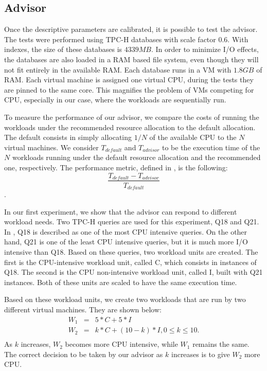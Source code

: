  \subsection{Advisor}
 
 Once the descriptive parameters are calibrated, it is possible to test the advisor. The tests were performed using TPC-H databases with scale factor 0.6. With indexes, the size of these databases is $4339 MB$. In order to minimize I/O effects, the databases are also loaded  in a RAM based file system, even though they will not fit entirely in the available RAM. Each database runs in a VM with $1.8 GB$ of RAM.  Each virtual machine is assigned one virtual CPU, during the tests they are pinned to the same core. This magnifies the problem of VMs competing for CPU, especially in our case, where the workloads are sequentially run.
 
 To measure the performance of our advisor, we compare the costs of running the workloads under the recommended resource allocation to the default allocation. The default consists in simply allocating $1/N$ of the available CPU to the $N$ virtual machines. We consider $T_{default}$ and $T_{advisor}$ to be the execution time of the $N$ workloads running under the default resource allocation and the recommended one, respectively. The performance metric, defined in \cite{Soror:2008:AVM:1376616.1376711}, is the following:
 \[
  \frac{T_{default}-T_{advisor}}{T_{default}}
 \]
.

In our first experiment, we show that the advisor can respond to different workload needs. Two TPC-H queries are used for this experiment, Q18 and Q21. In \cite{Soror:2008:AVM:1376616.1376711}, Q18 is described as one of the most CPU intensive queries. On the other hand, Q21 is one of the least CPU intensive queries, but it is much more I/O intensive than Q18. Based on these queries, two workload units are created. The first is the CPU-intensive workload unit, called C, which consists in instances of Q18. The second is the CPU non-intensive workload unit, called I, built with Q21 instances. Both of these units are scaled to have the same execution time.

Based on these workload units, we create two workloads that are run by two different virtual machines. They are shown below:
\begin{eqnarray*}
 W_{1} &=& 5*C + 5*I \\
 W_{2} &=& k*C + (10-k)*I, 0 \leq k \leq 10. \\
\end{eqnarray*}
As $k$ increases, $W_{2}$ becomes more CPU intensive, while $W_{1}$ remains the same. The correct decision to be taken by our advisor as $k$ increases is to give $W_{2}$ more CPU.


